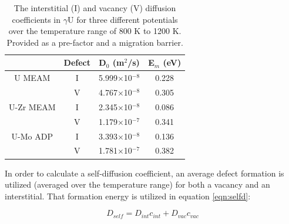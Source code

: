 \documentclass[review]{elsarticle}
\begin{document}
\begin{table}[h]
\caption{The interstitial (I) and vacancy (V) diffusion coefficients in $\gamma$U for three different potentials over the temperature range of 800 K to 1200 K. Provided as a pre-factor and a migration barrier.} \label{tab:diff}
\begin{center}
\begin{tabular}{|c|c|c|c|}
	\hline
	& Defect & D$_{0}$ (m$^{2}$/s) & E$_{m}$ (eV)\\
	 \hline
	U MEAM & I & 5.999$\times$10$^{-8}$ & 0.228 \\
			& V & 4.767$\times$10$^{-8}$ & 0.305 \\
			\hline
	U-Zr MEAM & I & 2.345$\times$10$^{-8}$ & 0.086 \\
			& V & 1.179$\times$10$^{-7}$ & 0.341 \\
			\hline
	U-Mo ADP & I & 3.393$\times$10$^{-8}$ & 0.136 \\
			& V & 1.781$\times$10$^{-7}$ & 0.382 \\
	\hline
\end{tabular}
\end{center}
\label{default}
\end{table}

In order to calculate a self-diffusion coefficient, an average defect formation is utilized (averaged over the temperature range) for both a vacancy and an interstitial. That formation energy is utilized in equation \ref{eqn:selfd}:

\begin{equation}
\label{eqn:selfd}
D_{self} = D_{int}c_{int} + D_{vac}c_{vac}
\end{equation} 
\end{document}
